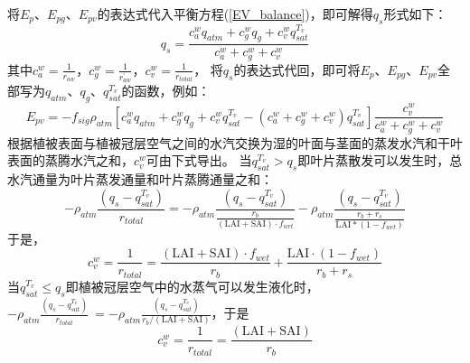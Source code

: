 将$E_p$、$E_{pg}$、$E_{pv}$的表达式代入平衡方程(\ref{EV_balance})，即可解得$q_s$形式如下：
\begin{equation}
q_{s}=\frac{c_{a}^{w} q_{atm}+c_{g}^{w} q_{g}+c_{v}^{w} q_{s a t}^{T_{v}}}{c_{a}^{w}+c_{g}^{w}+c_{v}^{w}}
\end{equation}
其中$c_a^w=\frac{1}{r_{aw}}$，$c_g^w=\frac{1}{r_{aw}^\prime}$，$c_v^w=\frac{1}{r_{total}}$，
将$q_s$的表达式代回，即可将$E_p$、$E_{pg}$、$E_{pv}$全部写为$q_{atm}$、$q_g$、$q_{sat}^{T_v}$的函数，例如：
\begin{equation}
E_{p v}=-f_{sig} \rho_{atm}\left[c_{a}^{w} q_{atm}+c_{g}^{w} q_{g}+c_{v}^{w} q_{s a t}^{T_{v}}-
\left(c_{a}^{w}+c_{g}^{w}+c_{v}^{w}\right) q_{s a t}^{T_{v}}\right] \frac{c_{v}^{w}}{c_{a}^{w}+c_{g}^{w}+c_{v}^{w}}
\end{equation}
根据植被表面与植被冠层空气之间的水汽交换为湿的叶面与茎面的蒸发水汽和干叶表面的蒸腾水汽之和，$c_v^w$可由下式导出。
当$q_{sat}^{T_v}>q_s$即叶片蒸散发可以发生时，总水汽通量为叶片蒸发通量和叶片蒸腾通量之和：
\begin{equation}
-\rho_{atm} \frac{\left(q_{s}-q_{s a t}^{T_{v}}\right)}{r_{{total }}}=-\rho_{atm} 
\frac{\left(q_{s}-q_{s a t}^{T_{v}}\right)}{\frac{r_{b}}{(\text {LAI}+\text {SAI}) \cdot f_{{wet }}}}-\rho_{atm} \frac{\left(q_{s}-q_{s a t}^{T_{v}}\right)}{\frac{r_{b}+r_{s}}{\text {LAI} *\left(1-f_{{wet }}\right)}}
\end{equation}
于是，
\begin{equation}
c_{v}^{w}=\frac{1}{r_{{total }}}=\frac{(\text {LAI}+\text {SAI}) \cdot f_{{wet }}}{r_{b}}+\frac{\text {LAI} \cdot \left(1-f_{{wet}}\right)}{r_{b}+r_{s}}
\end{equation}
当$q_{sat}^{T_v}\le q_s$即植被冠层空气中的水蒸气可以发生液化时，
$-\rho_{atm}\frac{\left(q_s-q_{sat}^{T_v}\right)}{r_{total}}\ =-\rho_{atm}\frac{\left(q_s-q_{sat}^{T_v}\right)}{r_b/\left(\text {LAI}+\text {SAI}\right)}$，于是
\begin{equation}
c_{v}^{w}=\frac{1}{r_{{total }}}=\frac{(\text {LAI}+\text {SAI})}{r_{b}}
\end{equation}

